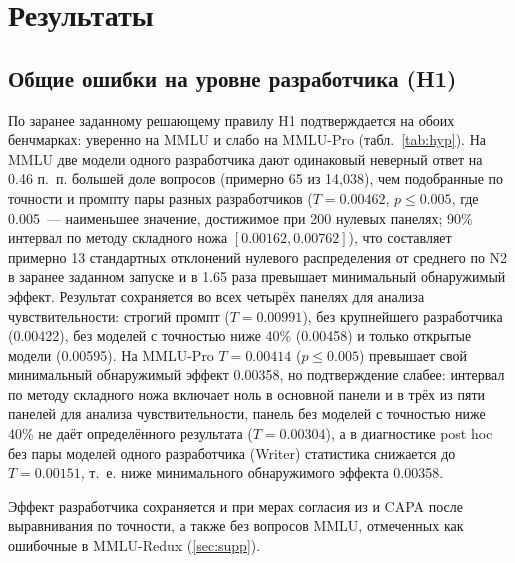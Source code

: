 \documentclass[preprint,12pt,authoryear]{elsarticle}
\begin{document}
\section{Результаты}

\subsection{Общие ошибки на уровне разработчика (H1)}
По заранее заданному решающему правилу H1 подтверждается на обоих бенчмарках: уверенно на MMLU и слабо на MMLU-Pro (табл.~\ref{tab:hyp}). На MMLU две модели одного разработчика дают одинаковый неверный ответ на 0.46 п.~п. большей доле вопросов (примерно 65 из 14,038), чем подобранные по точности и промпту пары разных разработчиков ($T = 0.00462$, $p \le 0.005$, где 0.005~--- наименьшее значение, достижимое при 200 нулевых панелях; 90\% интервал по методу складного ножа $[0.00162, 0.00762]$), что составляет примерно 13 стандартных отклонений нулевого распределения от среднего по N2 в заранее заданном запуске и в 1.65 раза превышает минимальный обнаружимый эффект. Результат сохраняется во всех четырёх панелях для анализа чувствительности: строгий промпт ($T=0.00991$), без крупнейшего разработчика (0.00422), без моделей с точностью ниже 40\% (0.00458) и только открытые модели (0.00595). На MMLU-Pro $T=0.00414$ ($p \le 0.005$) превышает свой минимальный обнаружимый эффект 0.00358, но подтверждение слабее: интервал по методу складного ножа включает ноль в основной панели и в трёх из пяти панелей для анализа чувствительности, панель без моделей с точностью ниже 40\% не даёт определённого результата ($T=0.00304$), а в диагностике post hoc без пары моделей одного разработчика (Writer) статистика снижается до $T=0.00151$, т.~е. ниже минимального обнаружимого эффекта 0.00358.

Эффект разработчика сохраняется и при мерах согласия из \citet{kim2025correlated} и CAPA \citep{goel2025great} после выравнивания по точности, а также без вопросов MMLU, отмеченных как ошибочные в MMLU-Redux (\ref{sec:supp}).
\end{document}
